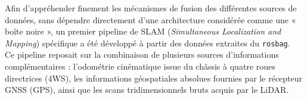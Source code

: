 \documentclass[12pt,a4paper,oneside]{report}
\begin{document}
\hspace*{.3cm}Afin d'appréhender finement les mécanismes de fusion des différentes sources de données, sans dépendre directement d'une architecture considérée comme une « boîte noire », un premier pipeline de SLAM (\textit{Simultaneous Localization and Mapping}) spécifique a été développé à partir des données extraites du \texttt{rosbag}.\\

\hspace*{.3cm}Ce pipeline reposait sur la combinaison de plusieurs sources d'informations complémentaires : l'odométrie cinématique issue du châssis à quatre roues directrices (4WS), les informations géospatiales absolues fournies par le récepteur GNSS (GPS), ainsi que les scans tridimensionnels bruts acquis par le LiDAR.\\
\end{document}
